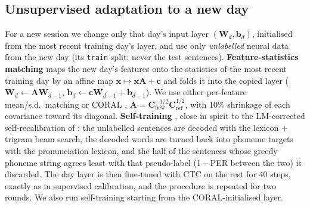 \subsection{Unsupervised adaptation to a new day}
\label{sec:tta}
For a new session we change only that day's input layer $(\mathbf{W}_d,\mathbf{b}_d)$, initialised from the most recent training day's layer, and use only \emph{unlabelled} neural data from the new day (its \texttt{train} split; never the test sentences).
\textbf{Feature-statistics matching} maps the new day's features onto the statistics of the most recent training day by an affine map $\mathbf{x}\mapsto\mathbf{x}\mathbf{A}+\mathbf{c}$ and folds it into the copied layer ($\mathbf{W}_d\leftarrow\mathbf{A}\mathbf{W}_{d-1}$, $\mathbf{b}_d\leftarrow\mathbf{c}\mathbf{W}_{d-1}+\mathbf{b}_{d-1}$). We use either per-feature mean/s.d.\ matching or CORAL \citep{sun2016coral}, $\mathbf{A}=\mathbf{C}_{\text{new}}^{-1/2}\mathbf{C}_{\text{ref}}^{1/2}$, with 10\% shrinkage of each covariance toward its diagonal.
\textbf{Self-training} \citep{kahn2020selftraining}, close in spirit to the LM-corrected self-recalibration of \citet{fan2023plug}: the unlabelled sentences are decoded with the lexicon + trigram beam search, the decoded words are turned back into phoneme targets with the pronunciation lexicon, and the half of the sentences whose greedy phoneme string agrees least with that pseudo-label (1\,$-$\,PER between the two) is discarded. The day layer is then fine-tuned with CTC on the rest for 40 steps, exactly as in supervised calibration, and the procedure is repeated for two rounds. We also run self-training starting from the CORAL-initialised layer.
